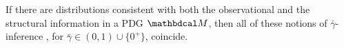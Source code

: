 \documentclass{article}
\newcommand\discard[1]{}
\newcommand\zogamma{{\bar\gamma}}
\begin{document}
If there are distributions
consistent with
both the observational and the structural information
in a PDG $\dg M$, 
then all of these notions of $\zogamma$-inference
\unskip, for $\zogamma \in (0,1) \cup \{0^+\}$,
coincide.
\discard{
    For PDGs satisfying a mild condition 
    (required by definition in \citeauthor{pdg-aaai})
    which for now we call \emph{proper},
    selecting a small enough positive value of $\zogamma$
    suffices to ensure that
    the $\zogamma$-semantics consists of only a single distribution.
    The $0^+$ semantics of a proper PDG is also a unique distribution,
    and one that does not depend on the choice of a small positive number. }%
\end{document}
